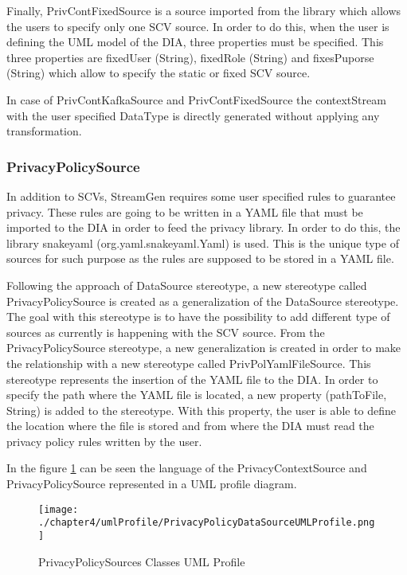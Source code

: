 Finally, PrivContFixedSource is a source imported from the library which allows the users to specify only one SCV source. In order to do this, when the user is defining the UML model of the DIA, three properties must be specified. This three properties are fixedUser (String), fixedRole (String) and fixesPuporse (String) which allow to specify the static or fixed SCV source.

In case of PrivContKafkaSource and PrivContFixedSource the contextStream with the user specified DataType is directly generated without applying any transformation.

\subsubsection{PrivacyPolicySource}

In addition to SCVs, StreamGen requires some user specified rules to guarantee privacy. These rules are going to be written in a YAML file that must be imported to the DIA in order to feed the privacy library. In order to do this, the library snakeyaml (org.yaml.snakeyaml.Yaml) is used. This is the unique type of sources for such purpose as the rules are supposed to be stored in a YAML file.

Following the approach of DataSource stereotype, a new stereotype called PrivacyPolicySource is created as a generalization of the DataSource stereotype. The goal with this stereotype is to have the possibility to add different type of sources as currently is happening with the SCV source. From the PrivacyPolicySource stereotype, a new generalization is created in order to make the relationship with a new stereotype called PrivPolYamlFileSource. This stereotype represents the insertion of the YAML file to the DIA. In order to specify the path where the YAML file is located, a new property (pathToFile, String) is added to the stereotype. With this property, the user is able to define the location where the file is stored and from where the DIA must read the privacy policy rules written by the user.

In the figure \ref{fig:PrivacyPolicySources Classes UML Profile} can be seen the language of the PrivacyContextSource and PrivacyPolicySource represented in a UML profile diagram.

\begin{figure}
\centering
{\texttt{[image: ./chapter4/umlProfile/PrivacyPolicyDataSourceUMLProfile.png]}}
\caption{PrivacyPolicySources Classes UML Profile}
\label{fig:PrivacyPolicySources Classes UML Profile}
\end{figure}

